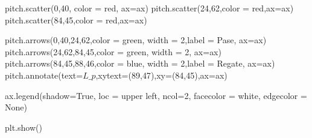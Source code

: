 \documentclass[
  us-letterpaper,
  DIV=11,
  numbers=noendperiod]{scrreprt}
\newenvironment{Shaded}{\begin{snugshade}}{\end{snugshade}}
\newcommand{\DecValTok}[1]{\textcolor[rgb]{0.68,0.00,0.00}{#1}}
\newcommand{\NormalTok}[1]{\textcolor[rgb]{0.00,0.23,0.31}{#1}}
\newcommand{\OperatorTok}[1]{\textcolor[rgb]{0.37,0.37,0.37}{#1}}
\newcommand{\StringTok}[1]{\textcolor[rgb]{0.13,0.47,0.30}{#1}}
\newcommand{\VariableTok}[1]{\textcolor[rgb]{0.07,0.07,0.07}{#1}}
\begin{document}
\begin{Shaded}
\begin{Highlighting}[]
\NormalTok{pitch.scatter(}\DecValTok{0}\NormalTok{,}\DecValTok{40}\NormalTok{, color }\OperatorTok{=} \StringTok{\textquotesingle{}red\textquotesingle{}}\NormalTok{, ax}\OperatorTok{=}\NormalTok{ax)}
\NormalTok{pitch.scatter(}\DecValTok{24}\NormalTok{,}\DecValTok{62}\NormalTok{,color }\OperatorTok{=} \StringTok{\textquotesingle{}red\textquotesingle{}}\NormalTok{,ax}\OperatorTok{=}\NormalTok{ax)}
\NormalTok{pitch.scatter(}\DecValTok{84}\NormalTok{,}\DecValTok{45}\NormalTok{,color }\OperatorTok{=} \StringTok{\textquotesingle{}red\textquotesingle{}}\NormalTok{,ax}\OperatorTok{=}\NormalTok{ax)}

\NormalTok{pitch.arrows(}\DecValTok{0}\NormalTok{,}\DecValTok{40}\NormalTok{,}\DecValTok{24}\NormalTok{,}\DecValTok{62}\NormalTok{,color }\OperatorTok{=} \StringTok{\textquotesingle{}green\textquotesingle{}}\NormalTok{, width }\OperatorTok{=} \DecValTok{2}\NormalTok{,label }\OperatorTok{=} \StringTok{\textquotesingle{}Pase\textquotesingle{}}\NormalTok{, ax}\OperatorTok{=}\NormalTok{ax)}
\NormalTok{pitch.arrows(}\DecValTok{24}\NormalTok{,}\DecValTok{62}\NormalTok{,}\DecValTok{84}\NormalTok{,}\DecValTok{45}\NormalTok{,color }\OperatorTok{=} \StringTok{\textquotesingle{}green\textquotesingle{}}\NormalTok{, width }\OperatorTok{=} \DecValTok{2}\NormalTok{, ax}\OperatorTok{=}\NormalTok{ax)}
\NormalTok{pitch.arrows(}\DecValTok{84}\NormalTok{,}\DecValTok{45}\NormalTok{,}\DecValTok{88}\NormalTok{,}\DecValTok{46}\NormalTok{,color }\OperatorTok{=} \StringTok{\textquotesingle{}blue\textquotesingle{}}\NormalTok{, width }\OperatorTok{=} \DecValTok{2}\NormalTok{,label }\OperatorTok{=} \StringTok{\textquotesingle{}Regate\textquotesingle{}}\NormalTok{, ax}\OperatorTok{=}\NormalTok{ax)}
\NormalTok{pitch.annotate(text}\OperatorTok{=}\StringTok{\textquotesingle{}$L\_p$\textquotesingle{}}\NormalTok{,xytext}\OperatorTok{=}\NormalTok{(}\DecValTok{89}\NormalTok{,}\DecValTok{47}\NormalTok{),xy}\OperatorTok{=}\NormalTok{(}\DecValTok{84}\NormalTok{,}\DecValTok{45}\NormalTok{),ax}\OperatorTok{=}\NormalTok{ax)}

\NormalTok{ax.legend(shadow}\OperatorTok{=}\VariableTok{True}\NormalTok{, loc }\OperatorTok{=} \StringTok{\textquotesingle{}upper left\textquotesingle{}}\NormalTok{, ncol}\OperatorTok{=}\DecValTok{2}\NormalTok{, facecolor }\OperatorTok{=} \StringTok{\textquotesingle{}white\textquotesingle{}}\NormalTok{, edgecolor }\OperatorTok{=} \StringTok{\textquotesingle{}None\textquotesingle{}}\NormalTok{)}

\NormalTok{plt.show()}
\end{Highlighting}
\end{Shaded}
\end{document}
